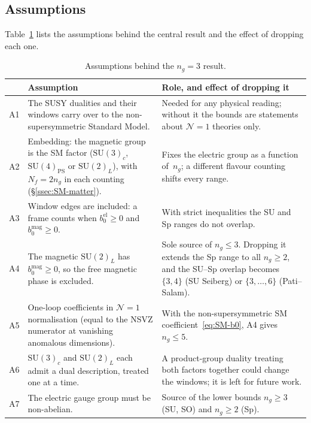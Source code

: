 \documentclass[11pt,a4paper]{article}
\theoremstyle{plain}
\theoremstyle{definition}
\theoremstyle{remark}
\newcommand{\Nf}{N_{\!f}}
\newcommand{\ngen}{n_g}
\newcommand{\SU}[1]{\mathrm{SU}(#1)}
\begin{document}
\subsection{Assumptions}
\label{ssec:assumptions}

Table~\ref{tab:assumptions} lists the assumptions behind the central
result and the effect of dropping each one.

\begin{table}[h!]
\centering
\small
\renewcommand{\arraystretch}{1.35}
\begin{tabular}{@{}p{0.6cm} p{6.3cm} p{7.4cm}@{}}
\toprule
& \textbf{Assumption} & \textbf{Role, and effect of dropping it} \\
\midrule
A1 & The SUSY dualities and their windows carry over to the
  non-supersymmetric Standard Model. &
  Needed for any physical reading; without it the bounds are statements
  about $\mathcal{N}=1$ theories only. \\
A2 & Embedding: the magnetic group is the SM factor ($\SU{3}_c$,
  $\SU{4}_{\mathrm{PS}}$ or $\SU{2}_L$), with $\Nf = 2\ngen$ in each
  counting (\S\ref{ssec:SM-matter}). &
  Fixes the electric group as a function of~$\ngen$; a different flavour
  counting shifts every range. \\
A3 & Window edges are included: a frame counts when
  $b_0^{\mathrm{el}} \geq 0$ and $b_0^{\mathrm{mag}} \geq 0$. &
  With strict inequalities the SU and Sp ranges do not overlap. \\
A4 & The magnetic $\SU{2}_L$ has $b_0^{\mathrm{mag}} \geq 0$, so the free
  magnetic phase is excluded. &
  Sole source of $\ngen \leq 3$.  Dropping it extends the Sp range to all
  $\ngen \geq 2$, and the SU--Sp overlap becomes $\{3, 4\}$ (SU Seiberg)
  or $\{3, \ldots, 6\}$ (Pati--Salam). \\
A5 & One-loop coefficients in $\mathcal{N}=1$ normalisation (equal to the
  NSVZ numerator at vanishing anomalous dimensions). &
  With the non-supersymmetric SM coefficient~\eqref{eq:SM-b0}, A4 gives
  $\ngen \leq 5$. \\
A6 & $\SU{3}_c$ and $\SU{2}_L$ each admit a dual description, treated
  one at a time. &
  A product-group duality treating both factors together could change
  the windows; it is left for future work. \\
A7 & The electric gauge group must be non-abelian. &
  Source of the lower bounds $\ngen \geq 3$ (SU, SO) and $\ngen \geq 2$
  (Sp). \\
\bottomrule
\end{tabular}
\caption{Assumptions behind the $\ngen = 3$ result.}
\label{tab:assumptions}
\end{table}
\end{document}
